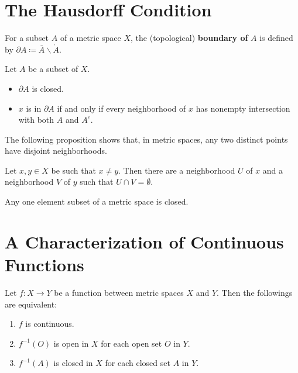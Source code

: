 \section{The Hausdorff Condition}

\begin{definition}
    For a subset \(A\) of a metric space \(X\), the (topological) \textbf{boundary of}
    \(A\) is defined by \(\partial A \coloneqq \overline{A}\backslash \mathring{A}\). 
\end{definition}

\begin{proposition}
    Let \(A\) be a subset of \(X\). 
    \begin{itemize}
        \item \(\partial A \) is closed. 
        \item \(x\) is in \(\partial A\) if and only if every neighborhood of \(x\) has 
        nonempty intersection with both \(A\) and \(A^c\). 
    \end{itemize}
\end{proposition}

The following proposition shows that, in metric spaces, any two distinct points have disjoint 
neighborhoods. 
\begin{proposition}
    Let \(x, y \in X\) be such that \(x \neq y\). Then there are a neighborhood \(U\)
    of \(x\) and a neighborhood \(V\) of \(y\) such that \(U \cap V = \emptyset\). 
\end{proposition}

\begin{corollary}
    Any one element subset of a metric space is closed. 
\end{corollary}

\section{A Characterization of Continuous Functions}

\begin{theorem}
    Let \(f \colon X \to Y \) be a function between metric spaces \(X\) and \(Y\). Then the followings
    are equivalent:
    \begin{enumerate}[label=(\roman*)]
        \item \(f\) is continuous. 
        \item \(f^{-1}\left(O\right)\) is open in \(X\) for each open set \(O\) in \(Y\). 
        \item \(f^{-1}\left(A\right)\) is closed in \(X\) for each closed set \(A\) in \(Y\). 
    \end{enumerate}
\end{theorem}

